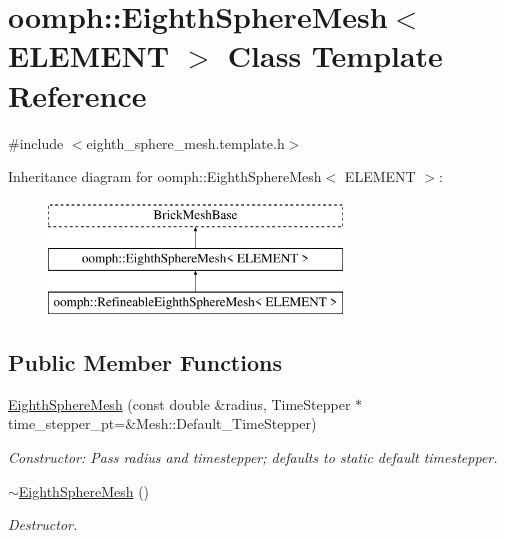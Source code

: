 \hypertarget{classoomph_1_1EighthSphereMesh}{}\section{oomph\+:\+:Eighth\+Sphere\+Mesh$<$ E\+L\+E\+M\+E\+NT $>$ Class Template Reference}
\label{classoomph_1_1EighthSphereMesh}


{\ttfamily \#include $<$eighth\+\_\+sphere\+\_\+mesh.\+template.\+h$>$}

Inheritance diagram for oomph\+:\+:Eighth\+Sphere\+Mesh$<$ E\+L\+E\+M\+E\+NT $>$\+:\begin{figure}[H]
\begin{center}
\leavevmode
\includegraphics[height=3.000000cm]{classoomph_1_1EighthSphereMesh}
\end{center}
\end{figure}
\subsection*{Public Member Functions}
\begin{DoxyCompactItemize}
\item 
\hyperlink{classoomph_1_1EighthSphereMesh_a0457fc188d930a1e8853a3f0e1effbb3}{Eighth\+Sphere\+Mesh} (const double \&radius, Time\+Stepper $\ast$time\+\_\+stepper\+\_\+pt=\&Mesh\+::\+Default\+\_\+\+Time\+Stepper)
\begin{DoxyCompactList}\small\item\em Constructor\+: Pass radius and timestepper; defaults to static default timestepper. \end{DoxyCompactList}\item 
\hyperlink{classoomph_1_1EighthSphereMesh_a425c3de92974d00dbb126f4cbbaf8e3b}{$\sim$\+Eighth\+Sphere\+Mesh} ()
\begin{DoxyCompactList}\small\item\em Destructor. \end{DoxyCompactList}\end{DoxyCompactItemize}
